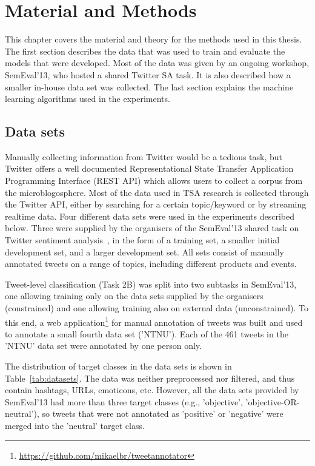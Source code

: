 \chapter{Material and Methods}
This chapter covers the material and theory for the methods used in this thesis. The first section describes the data that was used to train and evaluate the models that were developed. Most of the data was given by an ongoing workshop, SemEval'13, who hosted a shared Twitter SA task. It is also described how a smaller in-house data set was collected. The last section explains the machine learning algorithms used in the experiments.

\section{Data sets}
Manually collecting information from Twitter would be a tedious task, but Twitter offers a well documented Representational State Transfer Application Programming Interface (REST API) which allows users to collect a corpus from the microblogosphere. Most of the data used in TSA research is collected through the Twitter API, either by searching for a certain topic/keyword or by streaming realtime data. Four different data sets were used in the experiments described below. Three were supplied by the organisers of the SemEval'13 shared task on Twitter sentiment analysis~\citep{WilsonEA:13}, in the form of a training set, a smaller initial development set, and a larger development set. All sets consist of manually annotated tweets on a range of topics, including different products and events.

Tweet-level classification (Task 2B) was split into two subtasks in SemEval'13, one allowing training only on the data sets supplied by the organisers (constrained) and one allowing training also on external data (unconstrained). To this end, a web application\footnote{\url{https://github.com/mikaelbr/tweetannotator}} for manual annotation of tweets was built and used to annotate a small fourth data set ('NTNU'). Each of the 461 tweets in the 'NTNU' data set were annotated by one person only.

The distribution of target classes in the data sets is shown in Table~\ref{tab:datasets}. The data was neither preprocessed nor filtered, and thus contain hashtags, URLs, emoticons, etc. However, all the data sets provided by SemEval'13 had more than three target classes (e.g., 'objective', 'objective-OR-neutral'), so tweets that were not annotated as 'positive' or 'negative' were merged into the 'neutral' target class.

